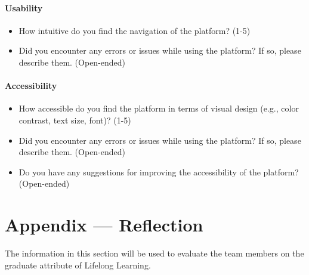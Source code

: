 \documentclass[12pt, titlepage]{article}
\begin{document}
\paragraph{Usability}
\begin{itemize}
    \item{How intuitive do you find the navigation of the platform? (1-5)}
    \item{Did you encounter any errors or issues while using the platform? If so, please describe them. (Open-ended)}
\end{itemize}


\paragraph{Accessibility}
\begin{itemize}
    \item{How accessible do you find the platform in terms of visual design (e.g., color contrast, text size, font)? (1-5)}
    \item{Did you encounter any errors or issues while using the platform? If so, please describe them. (Open-ended)}
    \item{Do you have any suggestions for improving the accessibility of the platform?
          (Open-ended)}
\end{itemize}

\newpage{}
\section*{Appendix --- Reflection}


The information in this section will be used to evaluate the team members on the
graduate attribute of Lifelong Learning.


\end{document}
